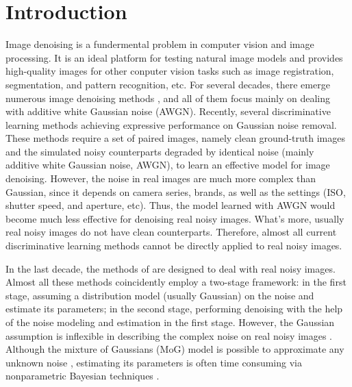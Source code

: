 \documentclass[10pt,twocolumn,letterpaper]{article}
\begin{document}
\section{Introduction}
Image denoising is a fundermental problem in computer vision and image processing. It is an ideal platform for testing natural image models and provides high-quality images for other conputer vision tasks such as image registration, segmentation, and pattern recognition, etc. For several decades, there emerge numerous image denoising methods \cite{nlm,foe,ksvd,bm3d,lssc,epll,burger2012image,wnnm,csf,pgpd,chen2015learning}, and all of them focus mainly on dealing with additive white Gaussian noise (AWGN). Recently, several discriminative learning methods \cite{burger2012image,csf,chen2015learning} achieving expressive performance on Gaussian noise removal. These methods require a set of paired images, namely clean ground-truth images and the simulated noisy counterparts degraded by identical noise (mainly additive white Gaussian noise, AWGN), to learn an effective model for image denoising. However, the noise in real images are much more complex than Gaussian, since it depends on camera series, brands, as well as the settings (ISO, shutter speed, and aperture, etc). Thus, the model learned with AWGN would become much less effective for denoising real noisy images. What's more, usually real noisy images do not have clean counterparts. Therefore, almost all current discriminative learning methods cannot be directly applied to real noisy images.

In the last decade, the methods of \cite{fullyblind,rabie2005robust,Liu2008,almapg,noiseclinic,Zhu_2016_CVPR,crosschannel2016} are designed to deal with real noisy images. Almost all these methods coincidently employ a two-stage framework: in the first stage, assuming a distribution model (usually Gaussian) on the noise and estimate its parameters; in the second stage, performing denoising with the help of the noise modeling and estimation in the first stage. However, the Gaussian assumption is inflexible in describing the complex noise on real noisy images \cite{Liu2008,crosschannel2016}. Although the mixture of Gaussians (MoG) model is possible to approximate any unknown noise \cite{Zhu_2016_CVPR}, estimating its parameters is often time consuming via nonparametric Bayesian techniques \cite{Zhu_2016_CVPR} \cite{Bishop}. 
\end{document}
